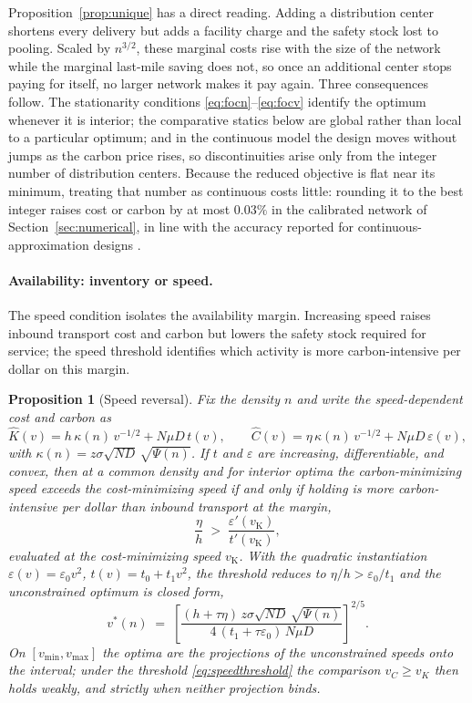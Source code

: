 \documentclass[11pt]{article}
\newtheorem{proposition}{Proposition}
\theoremstyle{definition}
\theoremstyle{remark}
\theoremstyle{plain}
\begin{document}
\noindent Proposition~\ref{prop:unique} has a direct reading. Adding a distribution center shortens every
delivery but adds a facility charge and the safety stock lost to pooling. Scaled by $n^{3/2}$, these marginal
costs rise with the size of the network while the marginal last-mile saving does not, so once an additional
center stops paying for itself, no larger network makes it pay again. Three consequences follow. The
stationarity conditions \eqref{eq:focn}--\eqref{eq:focv} identify the optimum whenever it is interior; the
comparative statics below are global rather than local to a particular optimum; and in the continuous model
the design moves without jumps as the carbon price rises, so discontinuities arise only from the integer
number of distribution centers. Because the reduced objective is flat near its minimum, treating that number
as continuous costs little: rounding it to the best integer raises cost or carbon by at most $0.03\%$ in the
calibrated network of Section~\ref{sec:numerical}, in line with the accuracy reported for
continuous-approximation designs \citep{ouyang2006discretization, ansari2018advancements}.

\paragraph{Availability: inventory or speed.} The speed condition isolates the availability margin.
Increasing speed raises inbound transport cost and carbon but lowers the safety stock required for service;
the speed threshold identifies which activity is more carbon-intensive per dollar on this margin.

\begin{proposition}[Speed reversal]\label{prop:speed}
Fix the density $n$ and write the speed-dependent cost and carbon as
\[
  \hat K(v)=h\,\kappa(n)\,v^{-1/2}+N\mu D\,t(v), \qquad \hat C(v)=\eta\,\kappa(n)\,v^{-1/2}+N\mu D\,\varepsilon(v),
\]
with $\kappa(n)=z\sigma\sqrt{ND}\,\sqrt{\Psi(n)}$. If $t$ and $\varepsilon$ are increasing,
differentiable, and convex, then at a common density and for
interior optima the carbon-minimizing speed exceeds the cost-minimizing speed if and only if holding is more
carbon-intensive per dollar than inbound transport \emph{at the margin},
\begin{equation}\label{eq:speedthreshold}
  \frac{\eta}{h} \;>\; \frac{\varepsilon'(v_{\mathrm K})}{t'(v_{\mathrm K})},
\end{equation}
evaluated at the cost-minimizing speed $v_{\mathrm K}$. With the quadratic instantiation
$\varepsilon(v)=\varepsilon_0 v^2$, $t(v)=t_0+t_1 v^2$, the threshold reduces to $\eta/h>\varepsilon_0/t_1$ and
the unconstrained optimum is closed form,
\begin{equation}\label{eq:vstar}
  v^*(n) \;=\; \left[\frac{(h+\tau\eta)\,z\sigma\sqrt{ND}\,\sqrt{\Psi(n)}}
                       {4\,(t_1+\tau\varepsilon_0)\,N\mu D}\right]^{2/5}.
\end{equation}
On $[v_{\min},v_{\max}]$ the optima are the projections of the unconstrained speeds onto the interval; under
the threshold \eqref{eq:speedthreshold} the comparison $v_C\ge v_K$ then holds weakly, and strictly when
neither projection binds.
\end{proposition}
\end{document}
